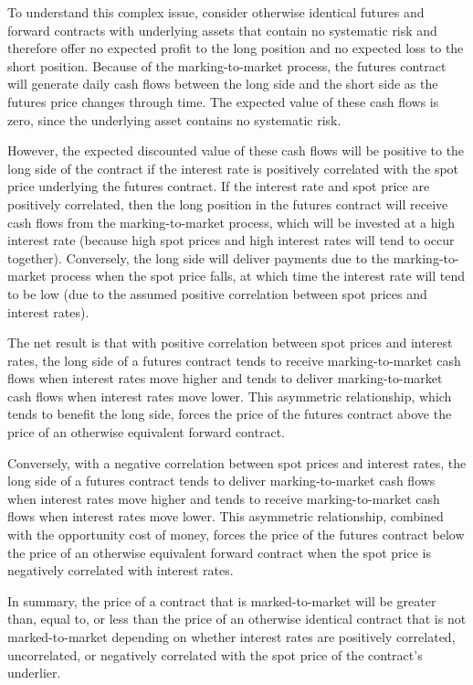 \documentclass[11pt]{article}
\begin{document}
To understand this complex issue, consider otherwise identical futures and forward contracts with underlying assets that contain no systematic risk and therefore offer no expected profit to the long position and no expected loss to the short position. Because of the marking-to-market process, the futures contract will generate daily cash flows between the long side and the short side as the futures price changes through time. The expected value of these cash flows is zero, since the underlying asset contains no systematic risk.

However, the expected discounted value of these cash flows will be positive to the long side of the contract if the interest rate is positively correlated with the spot price underlying the futures contract. If the interest rate and spot price are positively correlated, then the long position in the futures contract will receive cash flows from the marking-to-market process, which will be invested at a high interest rate (because high spot prices and high interest rates will tend to occur together). Conversely, the long side will deliver payments due to the marking-to-market process when the spot price falls, at which time the interest rate will tend to be low (due to the assumed positive correlation between spot prices and interest rates).

The net result is that with positive correlation between spot prices and interest rates, the long side of a futures contract tends to receive marking-to-market cash flows when interest rates move higher and tends to deliver marking-to-market cash flows when interest rates move lower. This asymmetric relationship, which tends to benefit the long side, forces the price of the futures contract above the price of an otherwise equivalent forward contract.

Conversely, with a negative correlation between spot prices and interest rates, the long side of a futures contract tends to deliver marking-to-market cash flows when interest rates move higher and tends to receive marking-to-market cash flows when interest rates move lower. This asymmetric relationship, combined with the opportunity cost of money, forces the price of the futures contract below the price of an otherwise equivalent forward contract when the spot price is negatively correlated with interest rates.

In summary, the price of a contract that is marked-to-market will be greater than, equal to, or less than the price of an otherwise identical contract that is not marked-to-market depending on whether interest rates are positively correlated, uncorrelated, or negatively correlated with the spot price of the contract's underlier.
\end{document}
